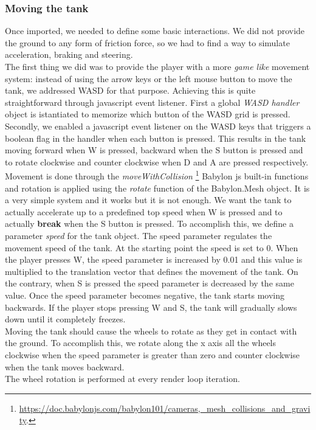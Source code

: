 \documentclass[14pt]{article}
\begin{document}
\subsubsection{Moving the tank}
Once imported, we needed to define some basic interactions. We did not provide the ground to any form of friction force, so we had to find a way to simulate acceleration, braking and steering. \\
The first thing we did was to provide the player with a more \textit{game like} movement system: instead of using the arrow keys or the left mouse button to move the tank, we addressed WASD for that purpose. Achieving this is quite straightforward through javascript event listener. First a global \textit{WASD handler} object is istantiated to memorize which button of the WASD grid is pressed. Secondly, we enabled a javascript event listener on the WASD keys that triggers a boolean flag in the handler when each button is pressed. This results in the tank moving forward when W is pressed, backward when the S button is pressed and to rotate clockwise and counter clockwise when D and A are pressed respectively. Movement is done through the \textit{moveWithCollision} 
\footnote{\url{https://doc.babylonjs.com/babylon101/cameras,_mesh_collisions_and_gravity}.}
Babylon js built-in functions and rotation is applied using the \textit{rotate} function of the Babylon.Mesh object. It is a very simple system and it works but it is not enough. We want the tank to actually accelerate up to a predefined top speed when W is pressed and to actually \textbf{break} when the S button is pressed. To accomplish this, we define a parameter \textit{speed} for the tank object. The speed parameter regulates the movement speed of the tank. At the starting point the speed is set to 0. When the player presses W, the speed parameter is increased by 0.01 and this value is multiplied to the translation vector that defines the movement of the tank. On the contrary, when S is pressed the speed parameter is decreased by the same value. Once the speed parameter becomes negative, the tank starts moving backwards. If the player stops pressing W and S, the tank will gradually slows down until it completely freezes. \\
Moving the tank should cause the wheels to rotate as they get in contact with the ground. To accomplish this, we rotate along the x axis all the wheels clockwise when the speed parameter is greater than zero and counter clockwise when the tank moves backward.\\
The wheel rotation is performed at every render loop iteration.\\
\end{document}
